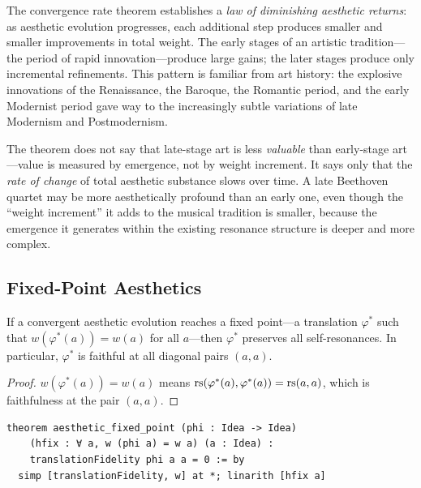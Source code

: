 \begin{interpretation}
\label{interp:diminishing-returns-aesthetics}
The convergence rate theorem establishes a \emph{law of diminishing aesthetic returns}: as aesthetic evolution progresses, each additional step produces smaller and smaller improvements in total weight.  The early stages of an artistic tradition---the period of rapid innovation---produce large gains; the later stages produce only incremental refinements.  This pattern is familiar from art history: the explosive innovations of the Renaissance, the Baroque, the Romantic period, and the early Modernist period gave way to the increasingly subtle variations of late Modernism and Postmodernism.

The theorem does not say that late-stage art is less \emph{valuable} than early-stage art---value is measured by emergence, not by weight increment.  It says only that the \emph{rate of change} of total aesthetic substance slows over time.  A late Beethoven quartet may be more aesthetically profound than an early one, even though the ``weight increment'' it adds to the musical tradition is smaller, because the emergence it generates within the existing resonance structure is deeper and more complex.
\end{interpretation}

\subsection{Fixed-Point Aesthetics}

\begin{theorem}
\label{thm:aesthetic-fixed-point}
If a convergent aesthetic evolution reaches a fixed point---a translation
$\varphi^*$ such that $w(\varphi^*(a)) = w(a)$ for all $a$---then $\varphi^*$
preserves all self-resonances.  In particular, $\varphi^*$ is faithful at
all diagonal pairs $(a, a)$.
\end{theorem}

\begin{proof}
$w(\varphi^*(a)) = w(a)$ means $\mathrm{rs}(\varphi^*(a), \varphi^*(a)) = \mathrm{rs}(a, a)$,
which is faithfulness at the pair $(a, a)$.
\end{proof}

\begin{lstlisting}
theorem aesthetic_fixed_point (phi : Idea -> Idea)
    (hfix : ∀ a, w (phi a) = w a) (a : Idea) :
    translationFidelity phi a a = 0 := by
  simp [translationFidelity, w] at *; linarith [hfix a]
\end{lstlisting}

